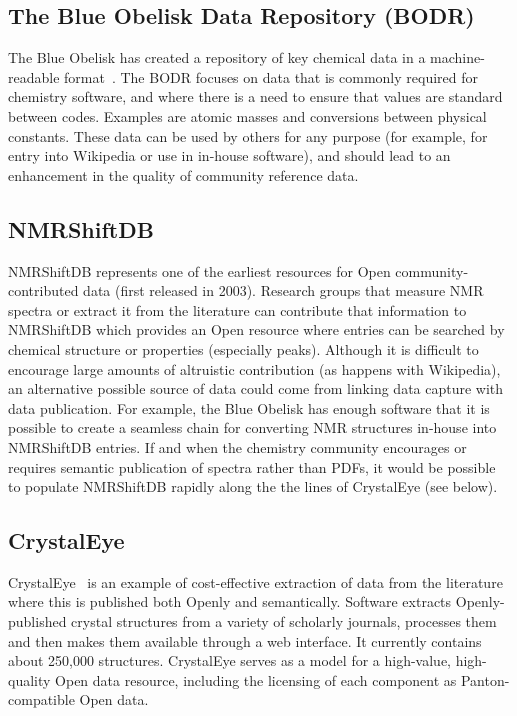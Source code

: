 \documentclass[10pt]{bmc_article}
\newenvironment{bmcformat}{\fussy\setboolean{publ}{true}}{\fussy}
\begin{document}
\begin{bmcformat}
\subsection*{The Blue Obelisk Data Repository (BODR)}

The Blue Obelisk has created a repository of key chemical
data in a machine-readable format~\cite{BODR}.
The BODR focuses on data that is commonly required for
chemistry software, and where there is a need to ensure that values
are standard between codes. Examples are atomic
masses and conversions between physical constants. These data
can be used by others for any purpose (for example, for entry into
Wikipedia or use in in-house software), and should lead
to an enhancement in the quality of community reference data.

\subsection*{NMRShiftDB}

NMRShiftDB \cite{nmrshiftdb, Steinbeck2004} represents one of the earliest resources for Open
community-contributed data (first released in 2003). Research groups that 
measure NMR spectra or extract it from the literature can contribute that
information to
NMRShiftDB which provides an Open resource where
entries can be searched by chemical structure or properties
(especially peaks). Although it is difficult to
encourage large amounts of altruistic contribution (as happens with
Wikipedia), an alternative possible source of data could come from
linking
data capture with data publication. For example, the Blue Obelisk has
enough software that it is possible to create
a seamless chain for converting NMR structures in-house into
NMRShiftDB entries. If and when the chemistry community
encourages or requires semantic publication of spectra rather than
PDFs, it would be possible to populate NMRShiftDB rapidly
along the the lines of CrystalEye (see below).

\subsection*{CrystalEye}

CrystalEye~\cite{WebCrystalEye} is an example of cost-effective extraction of data from the
literature where this is published both
Openly and semantically. Software extracts Openly-published crystal
structures from a variety of scholarly journals, processes
them and then makes them available through a web interface.
It currently contains about 250,000 structures. CrystalEye serves as a model
for a high-value, high-quality Open data
resource, including the licensing of each component as
Panton-compatible Open data.


\end{bmcformat}
\end{document}
